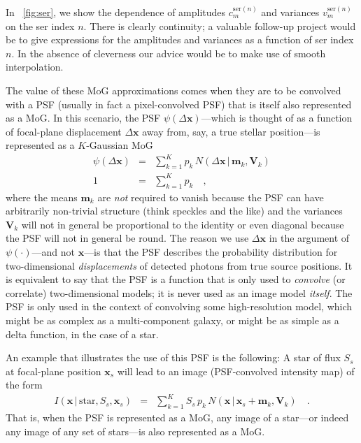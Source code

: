 \documentclass[12pt,pdftex,preprint]{aastex}
\newcommand{\tmatrix}[1]{\boldsymbol{#1}}
\newcommand{\tvector}[1]{\boldsymbol{#1}}
\newcommand{\pos}{\tvector{x}}
\newcommand{\mean}{\tvector{m}}
\newcommand{\var}{\tmatrix{V}}
\newcommand{\normal}{N}
\newcommand{\given}{\,|\,}
\renewcommand{\star}{\mathrm{star}}
\newcommand{\ser}{\mathrm{ser}}
\begin{document}
In \figurename~\ref{fig:ser}, we show the dependence of amplitudes
$c^{\ser(n)}_m$ and variances $v^{\ser(n)}_m$ on the ser index $n$.
There is clearly continuity; a valuable follow-up project would be to
give expressions for the amplitudes and variances as a function of ser
index $n$.  In the absence of cleverness our advice would be to make
use of smooth interpolation.

The value of these MoG approximations comes when they are to be
convolved with a PSF (usually in fact a pixel-convolved PSF) that is
itself also represented as a MoG.  In this scenario, the PSF
$\psi(\Delta\pos)$---which is thought of as a function of focal-plane
displacement $\Delta\pos$ away from, say, a true stellar position---is
represented as a $K$-Gaussian MoG
\begin{eqnarray}\displaystyle
\psi(\Delta\pos) &=& \sum_{k=1}^K p_k\,\normal(\Delta\pos\given\mean_k,\var_k)
\\
1 &=& \sum_{k=1}^K p_k
\quad ,
\end{eqnarray}
where the means $\mean_k$ are \emph{not} required to vanish because
the PSF can have arbitrarily non-trivial structure (think speckles and
the like) and the variances $\var_k$ will not in general be
proportional to the identity or even diagonal because the PSF will not
in general be round.  The reason we use $\Delta\pos$ in the argument
of $\psi(\cdot)$---and not $\pos$---is that the PSF describes the
probability distribution for two-dimensional \emph{displacements} of
detected photons from true source positions.  It is equivalent to say
that the PSF is a function that is only used to \emph{convolve} (or
correlate) two-dimensional models; it is never used as an image model
\emph{itself}.  The PSF is only used in the context of convolving some
high-resolution model, which might be as complex as a multi-component
galaxy, or might be as simple as a delta function, in the case of a
star.

An example that illustrates the use of this PSF is the following: A
star of flux $S_s$ at focal-plane position $\pos_s$ will lead to an
image (PSF-convolved intensity map) of the form
\begin{eqnarray}\displaystyle
I(\pos\given\star,S_s,\pos_s) &=& \sum_{k=1}^K S_s\,p_k\,\normal(\pos\given\pos_s+\mean_k,\var_k)
\quad .
\end{eqnarray}
That is, when the PSF is represented as a MoG, any image of a
star---or indeed any image of any set of stars---is also represented
as a MoG.
\end{document}
